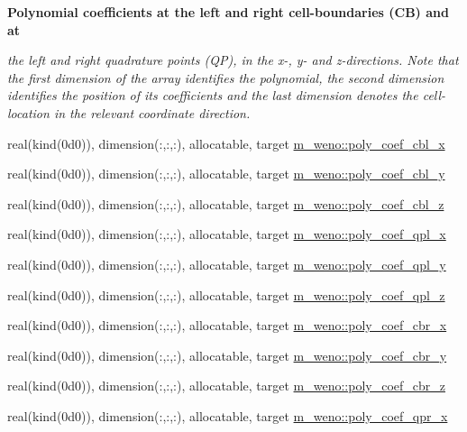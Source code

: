 \begin{Indent}\textbf{ Polynomial coefficients at the left and right cell-\/boundaries (CB) and at}\par
{\em the left and right quadrature points (QP), in the x-\/, y-\/ and z-\/directions. Note that the first dimension of the array identifies the polynomial, the second dimension identifies the position of its coefficients and the last dimension denotes the cell-\/location in the relevant coordinate direction. }\begin{DoxyCompactItemize}
\item 
real(kind(0d0)), dimension(\+:,\+:,\+:), allocatable, target \hyperlink{namespacem__weno_a213b935ef0b013f9e7fd5ebe10b9a4c8}{m\+\_\+weno\+::poly\+\_\+coef\+\_\+cbl\+\_\+x}
\item 
real(kind(0d0)), dimension(\+:,\+:,\+:), allocatable, target \hyperlink{namespacem__weno_aa1d7ef08c1ddba26e1fa12f287c810fa}{m\+\_\+weno\+::poly\+\_\+coef\+\_\+cbl\+\_\+y}
\item 
real(kind(0d0)), dimension(\+:,\+:,\+:), allocatable, target \hyperlink{namespacem__weno_af6c43f5ea0231043e8b5caf439c4719a}{m\+\_\+weno\+::poly\+\_\+coef\+\_\+cbl\+\_\+z}
\item 
real(kind(0d0)), dimension(\+:,\+:,\+:), allocatable, target \hyperlink{namespacem__weno_a3a6911a019190d7e3daa3d6a188785bb}{m\+\_\+weno\+::poly\+\_\+coef\+\_\+qpl\+\_\+x}
\item 
real(kind(0d0)), dimension(\+:,\+:,\+:), allocatable, target \hyperlink{namespacem__weno_abb402003bd3147b520a54b2ea59ca508}{m\+\_\+weno\+::poly\+\_\+coef\+\_\+qpl\+\_\+y}
\item 
real(kind(0d0)), dimension(\+:,\+:,\+:), allocatable, target \hyperlink{namespacem__weno_a223297ebb5fa0e103500e55799c77e36}{m\+\_\+weno\+::poly\+\_\+coef\+\_\+qpl\+\_\+z}
\item 
real(kind(0d0)), dimension(\+:,\+:,\+:), allocatable, target \hyperlink{namespacem__weno_a75f80d77048112859cb929065cb06dc6}{m\+\_\+weno\+::poly\+\_\+coef\+\_\+cbr\+\_\+x}
\item 
real(kind(0d0)), dimension(\+:,\+:,\+:), allocatable, target \hyperlink{namespacem__weno_a4a885bc8ac303d196e88dcace7853223}{m\+\_\+weno\+::poly\+\_\+coef\+\_\+cbr\+\_\+y}
\item 
real(kind(0d0)), dimension(\+:,\+:,\+:), allocatable, target \hyperlink{namespacem__weno_aab74b0a22a637066057e5f69353d33e2}{m\+\_\+weno\+::poly\+\_\+coef\+\_\+cbr\+\_\+z}
\item 
real(kind(0d0)), dimension(\+:,\+:,\+:), allocatable, target \hyperlink{namespacem__weno_acecc3a1f94b6dfafcf8490f29c84f17b}{m\+\_\+weno\+::poly\+\_\+coef\+\_\+qpr\+\_\+x}

\end{DoxyCompactItemize}
\end{Indent}
